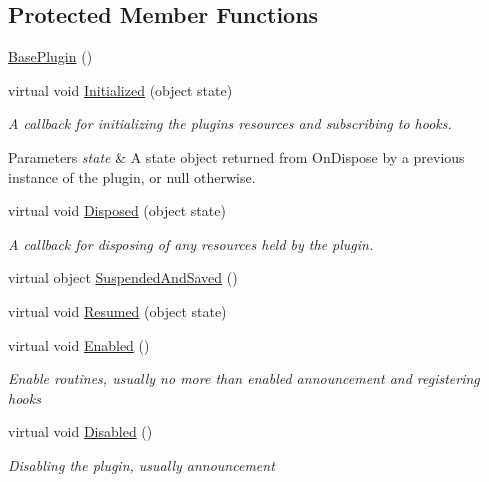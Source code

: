 \subsection*{Protected Member Functions}
\begin{DoxyCompactItemize}
\item 
\hyperlink{class_o_t_a_1_1_plugin_1_1_base_plugin_a26c9ff3a87d585ba9c9f3e95e48de987}{Base\+Plugin} ()
\item 
virtual void \hyperlink{class_o_t_a_1_1_plugin_1_1_base_plugin_aec0eb63b189e79a0ab06c4b65aeddbfa}{Initialized} (object state)
\begin{DoxyCompactList}\small\item\em A callback for initializing the plugin\textquotesingle{}s resources and subscribing to hooks. 
\begin{DoxyParams}{Parameters}
{\em state} & A state object returned from On\+Dispose by a previous instance of the plugin, or null otherwise. \\
\hline
\end{DoxyParams}
\end{DoxyCompactList}\item 
virtual void \hyperlink{class_o_t_a_1_1_plugin_1_1_base_plugin_a16190565c3559dd1da98f9ca242375fb}{Disposed} (object state)
\begin{DoxyCompactList}\small\item\em A callback for disposing of any resources held by the plugin. \end{DoxyCompactList}\item 
virtual object \hyperlink{class_o_t_a_1_1_plugin_1_1_base_plugin_af99bea5fbfc6c396fe20c792a175e0ad}{Suspended\+And\+Saved} ()
\item 
virtual void \hyperlink{class_o_t_a_1_1_plugin_1_1_base_plugin_af98fa3cde270ae116c83dc03cf5f432d}{Resumed} (object state)
\item 
virtual void \hyperlink{class_o_t_a_1_1_plugin_1_1_base_plugin_a23c95149e43d0ba5037eb302af044990}{Enabled} ()
\begin{DoxyCompactList}\small\item\em Enable routines, usually no more than enabled announcement and registering hooks \end{DoxyCompactList}\item 
virtual void \hyperlink{class_o_t_a_1_1_plugin_1_1_base_plugin_abc3cfe9fa2c5e0922db0eb059476eb0b}{Disabled} ()
\begin{DoxyCompactList}\small\item\em Disabling the plugin, usually announcement \end{DoxyCompactList}\item 

\end{DoxyCompactItemize}

